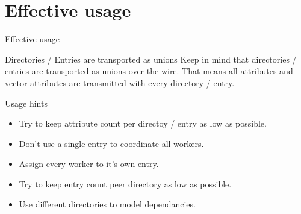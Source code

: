\documentclass{beamer}
\begin{document}
  \section{Effective usage}
    \begin{frame}{Effective usage}
      \begin{alertblock}{Directories / Entries are transported as unions}
        Keep in mind that directories / entries are transported as unions over the wire. That means 
        all attributes and vector attributes are transmitted with every directory / entry.
      \end{alertblock}
      
      \begin{block}{Usage hints}
        \begin{itemize}
          \item Try to keep attribute count per directoy / entry as low as possible.
          \item Don't use a single entry to coordinate all workers. 
          \item Assign every worker to it's own entry. 
          \item Try to keep entry count peer directory as low as possible.
          \item Use different directories to model dependancies.
          \end{itemize}
       \end{block}
    \end{frame}
    
\end{document}
